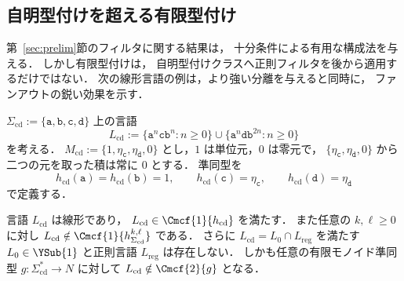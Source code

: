 
\subsection{自明型付けを超える有限型付け}
\label{subsec:finite-typing-separations}

第~\ref{sec:prelim}節のフィルタに関する結果は，
十分条件による有用な構成法を与える．
しかし有限型付けは，
自明型付けクラスへ正則フィルタを後から適用するだけではない．
次の線形言語の例は，より強い分離を与えると同時に，
ファンアウトの鋭い効果を示す．

$\Sigma_{\mathrm{cd}}
:=\{\mathtt a,\mathtt b,\mathtt c,\mathtt d\}$
上の言語
\[
 L_{\mathrm{cd}}
 :=\{\mathtt a^n\mathtt c\mathtt b^n:n\ge0\}
 \cup
 \{\mathtt a^n\mathtt d\mathtt b^{2n}:n\ge0\}
\]
を考える．
$M_{\mathrm{cd}}
:=\{1,\eta_{\mathtt c},\eta_{\mathtt d},0\}$
とし，$1$ は単位元，$0$ は零元で，
$\{\eta_{\mathtt c},\eta_{\mathtt d},0\}$
から二つの元を取った積は常に $0$ とする．
準同型を
\[
 h_{\mathrm{cd}}(\mathtt a)
 =h_{\mathrm{cd}}(\mathtt b)=1,\qquad
 h_{\mathrm{cd}}(\mathtt c)=\eta_{\mathtt c},
 \qquad
 h_{\mathrm{cd}}(\mathtt d)=\eta_{\mathtt d}
\]
で定義する．

\begin{proposition}[ファンアウトに敏感な型付き言語]
\label{prop:strong-fanout-separation}
言語 $L_{\mathrm{cd}}$ は線形であり，
\(L_{\mathrm{cd}}\in\Cmcf{1}{h_{\mathrm{cd}}}\)
を満たす．
また任意の $k,\ell\ge0$ に対し
\(L_{\mathrm{cd}} \notin\Cmcf{1}{h_{\Sigma_{\mathrm{cd}}}^{k,\ell}}\)
である．
さらに
$L_{\mathrm{cd}}=L_0\cap L_{\mathrm{reg}}$
を満たす
$L_0\in\YSub{1}$ と正則言語 $L_{\mathrm{reg}}$
は存在しない．
しかも任意の有限モノイド準同型
$g:\Sigma_{\mathrm{cd}}^*\to N$ に対して
\(L_{\mathrm{cd}}\notin\Cmcf{2}{g}\)
となる．
\end{proposition}

